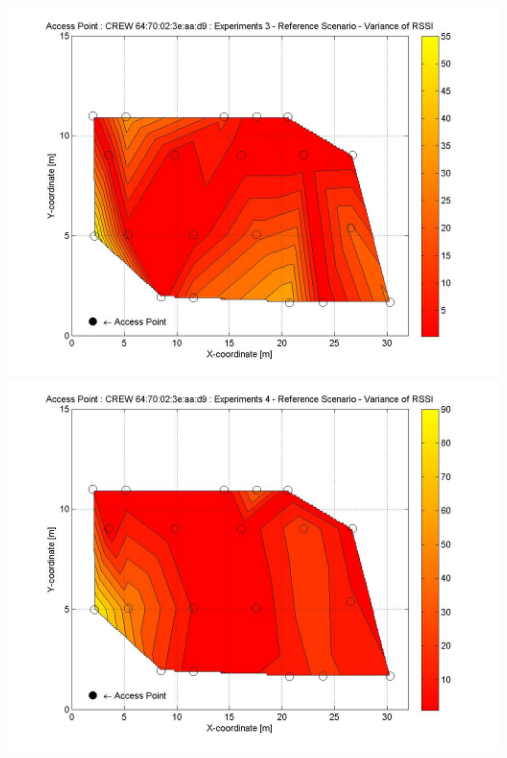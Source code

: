 \documentclass[11pt,a4paper,headinclude,footinclude,chapterprefix=on]{scrreprt}
\begin{document}
\begin{longtable}
	\includegraphics[width=13cm]{../../Source/plot/CREW_d9/d9_Ref_Ex_3_Variance.jpg} \\
	\includegraphics[width=13cm]{../../Source/plot/CREW_d9/d9_Ref_Ex_4_Variance.jpg} 
\end{longtable}
\end{document}
